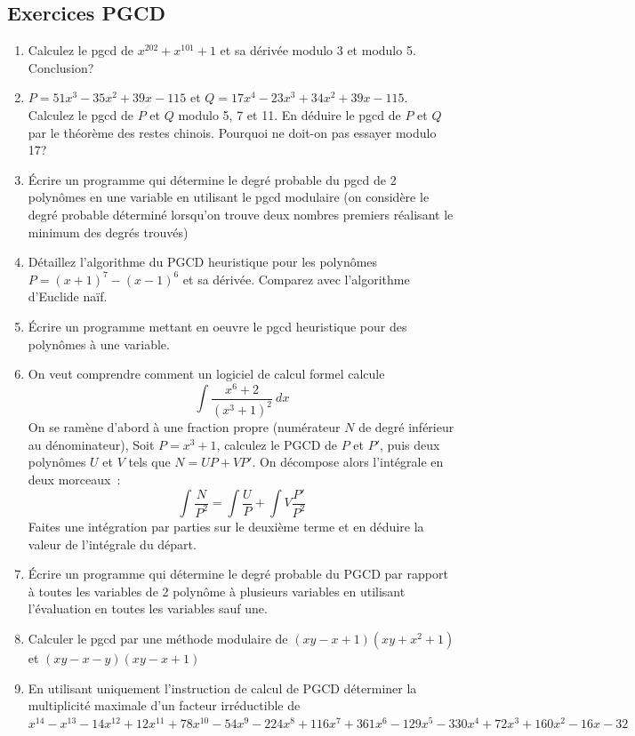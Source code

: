 \documentclass[a4paper,11pt]{article}
\begin{document}
\subsection{Exercices PGCD}
\begin{enumerate}

\item Calculez le pgcd de $x^{202}+x^{101}+1$
et sa dérivée modulo 3 et modulo 5. Conclusion?

\item $P=51x^3-35x^2+39x-115$ et $Q=17x^4-23x^3+34x^2+39x-115$.
Calculez le pgcd de $P$ et $Q$ modulo 5, 7 et 11. En déduire
le pgcd de $P$ et $Q$ par le théorème des restes chinois. Pourquoi
ne doit-on pas essayer modulo 17?

\item \'Ecrire un programme qui d\'etermine le degr\'e probable
du pgcd de 2 polyn\^omes en une variable en utilisant le pgcd modulaire 
(on consid\`ere le degr\'e probable d\'etermin\'e lorsqu'on trouve
deux nombres premiers r\'ealisant le minimum des degr\'es trouv\'es)

\item Détaillez l'algorithme du PGCD heuristique pour les
polynômes  $P=(x+1)^7-(x-1)^6$ et sa dérivée. Comparez avec l'algorithme
d'Euclide naïf.

\item \'Ecrire un programme mettant en oeuvre le pgcd heuristique
pour des polyn\^omes \`a une variable.

\item On veut comprendre comment un logiciel de calcul formel calcule
\[ \int \frac{x^6+2}{(x^3+1)^2} \ dx \]
On se ramène d'abord à une fraction propre (num\'erateur $N$ de degr\'e 
inf\'erieur au d\'enominateur),
Soit $P=x^3+1$, calculez le PGCD de $P$ et $P'$, puis
deux polyn\^omes $U$ et $V$ tels que $ N=UP+VP' $.
On d\'ecompose alors l'int\'egrale en deux morceaux~:\\
\[ \int \frac{N}{P^2}=\int \frac{U}{P}  + \int V \frac{P'}{P^2}  \]
Faites une int\'egration par parties sur le deuxi\`eme terme
et en d\'eduire la valeur de l'int\'egrale du d\'epart.


\item \'Ecrire un programme qui d\'etermine le degr\'e probable du PGCD 
par rapport \`a toutes les
variables de 2 polyn\^ome \`a plusieurs variables
en utilisant l'\'evaluation en toutes les variables
sauf une.

\item Calculer le pgcd par une m\'ethode modulaire de
$(xy-x+1)(xy+x^2+1)$ et $(xy-x-y)(xy-x+1)$

\item En utilisant uniquement l'instruction de calcul de PGCD
d\'eterminer la multiplicit\'e maximale d'un facteur irr\'eductible
de 
$x^{14}-x^{13}-14x^{12}+12x^{11}+78x^{10}-54x^9-224x^8+116x^7+361x^6-129x^5-330x^4+72x^3+160x^2-16x-32$

\end{enumerate}
\end{document}
